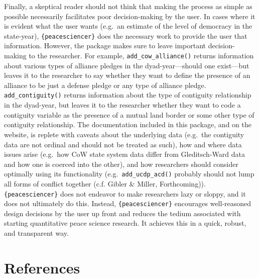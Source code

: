 \documentclass[
  11pt,
]{article}
\begin{document}
Finally, a skeptical reader should not think that making the process as simple as possible necessarily facilitates poor decision-making by the user. In cases where it is evident what the user wants (e.g.~an estimate of the level of democracy in the state-year), \texttt{\{peacesciencer\}} does the necessary work to provide the user that information. However, the package makes sure to leave important decision-making to the researcher. For example, \texttt{add\_cow\_alliance()} returns information about various types of alliance pledges in the dyad-year---should one exist---but leaves it to the researcher to say whether they want to define the presence of an alliance to be just a defense pledge or any type of alliance pledge. \texttt{add\_contiguity()} returns information about the type of contiguity relationship in the dyad-year, but leaves it to the researcher whether they want to code a contiguity variable as the presence of a mutual land border or some other type of contiguity relationship. The documentation included in this package, and on the website, is replete with caveats about the underlying data (e.g.~the contiguity data are not ordinal and should not be treated as such), how and where data issues arise (e.g.~how CoW state system data differ from Gleditsch-Ward data and how one is coerced into the other), and how researchers should consider optimally using its functionality (e.g.~\texttt{add\_ucdp\_acd()} probably should not lump all forms of conflict together (c.f. Gibler \& Miller, Forthcoming)). \texttt{\{peacesciencer\}} does not endeavor to make researchers lazy or sloppy, and it does not ultimately do this. Instead, \texttt{\{peacesciencer\}} encourages well-reasoned design decisions by the user up front and reduces the tedium associated with starting quantitative peace science research. It achieves this in a quick, robust, and transparent way.

\newpage

\hypertarget{references}{%
\section{References}\label{references}}

\setlength{\parskip}{6pt}
\end{document}
